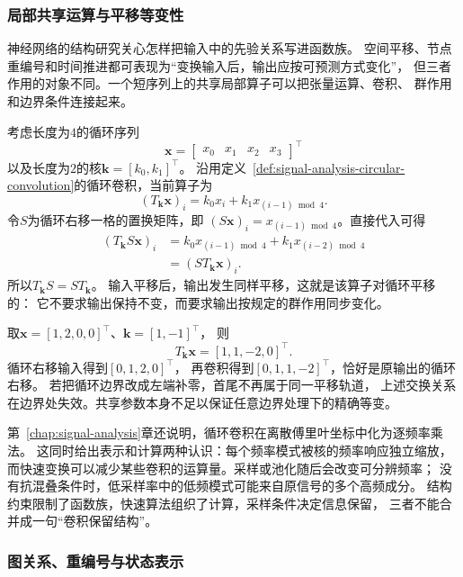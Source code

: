 \subsubsection{局部共享运算与平移等变性}
\label{sec:future-local-operations-convolution-equivariance}

神经网络的结构研究关心怎样把输入中的先验关系写进函数族。
空间平移、节点重编号和时间推进都可表现为“变换输入后，输出应按可预测方式变化”，
但三者作用的对象不同。一个短序列上的共享局部算子可以把张量运算、卷积、
群作用和边界条件连接起来。

考虑长度为$4$的循环序列
\[
  \bm{x}
  =
  \begin{bmatrix}
    x_0 & x_1 & x_2 & x_3
  \end{bmatrix}^{\top}
\]
以及长度为$2$的核$\bm{k}=[k_0,k_1]^{\top}$。
沿用定义~\ref{def:signal-analysis-circular-convolution}的循环卷积，当前算子为
\[
  (T_{\bm{k}}\bm{x})_i
  =
  k_0x_i+k_1x_{(i-1)\bmod 4}.
\]
令$S$为循环右移一格的置换矩阵，即
$(S\bm{x})_i=x_{(i-1)\bmod4}$。直接代入可得
\begin{align}
  (T_{\bm{k}}S\bm{x})_i
  &=
  k_0x_{(i-1)\bmod4}
  +
  k_1x_{(i-2)\bmod4}
  \nonumber\\
  &=
  (ST_{\bm{k}}\bm{x})_i.
  \label{eq:future-convolution-equivariance}
\end{align}
所以$T_{\bm{k}}S=ST_{\bm{k}}$。
输入平移后，输出发生同样平移，这就是该算子对循环平移的：
它不要求输出保持不变，而要求输出按规定的群作用同步变化。

\begin{example}[边界条件改变结构关系]
  \label{ex:future-convolution-boundary}
  取$\bm{x}=[1,2,0,0]^{\top}$、$\bm{k}=[1,-1]^{\top}$，
  则
  \[
    T_{\bm{k}}\bm{x}
    =
    [1,1,-2,0]^{\top}.
  \]
  循环右移输入得到$[0,1,2,0]^{\top}$，
  再卷积得到$[0,1,1,-2]^{\top}$，恰好是原输出的循环右移。
  若把循环边界改成左端补零，首尾不再属于同一平移轨道，
  上述交换关系在边界处失效。共享参数本身不足以保证任意边界处理下的精确等变。
\end{example}

第~\ref{chap:signal-analysis}章还说明，循环卷积在离散傅里叶坐标中化为逐频率乘法。
这同时给出表示和计算两种认识：每个频率模式被核的频率响应独立缩放，
而快速变换可以减少某些卷积的运算量。采样或池化随后会改变可分辨频率；
没有抗混叠条件时，低采样率中的低频模式可能来自原信号的多个高频成分。
结构约束限制了函数族，快速算法组织了计算，采样条件决定信息保留，
三者不能合并成一句“卷积保留结构”。

\subsubsection{图关系、重编号与状态表示}
\label{sec:future-sequences-graphs-state-representations}

